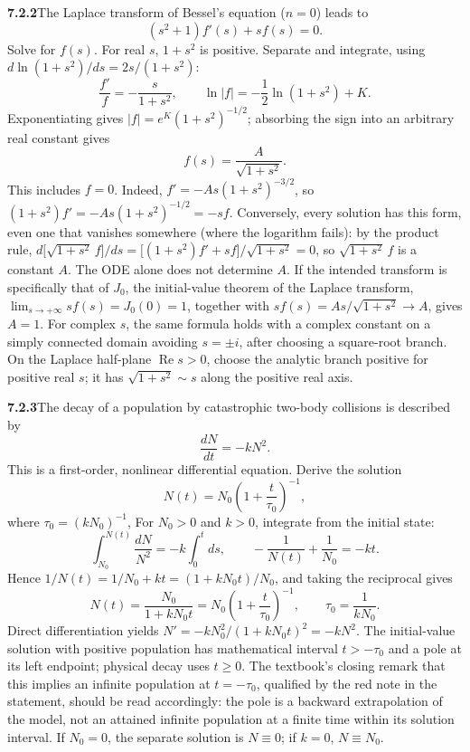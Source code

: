 \par\bigskip
\noindent\textbf{7.2.2}\quad The Laplace transform of Bessel's equation
($n=0$) leads to
\[
(s^{2}+1)f'(s)+sf(s)=0.
\]
Solve for $f(s)$.
\solution
For real $s$, $1+s^2$ is positive. Separate and integrate, using
$d\ln(1+s^2)/ds=2s/(1+s^2)$:
\[
\frac{f'}f=-\frac{s}{1+s^2},\qquad
\ln|f|=-\frac12\ln(1+s^2)+K.
\]
Exponentiating gives $|f|=e^K(1+s^2)^{-1/2}$; absorbing the sign into an
arbitrary real constant gives
\[
\boxed{f(s)=\frac{A}{\sqrt{1+s^2}}}.
\]
This includes $f=0$. Indeed,
$f'=-As(1+s^2)^{-3/2}$, so $(1+s^2)f'=-As(1+s^2)^{-1/2}=-sf$.
Conversely, every solution has this form, even one that vanishes
somewhere (where the logarithm fails): by the product rule,
$d\bigl[\sqrt{1+s^2}\,f\bigr]/ds=\bigl[(1+s^2)f'+sf\bigr]/\sqrt{1+s^2}=0$,
so $\sqrt{1+s^2}\,f$ is a constant $A$.
The ODE alone does not determine $A$. If the intended transform is
specifically that of $J_0$, the initial-value theorem of the Laplace
transform, $\lim_{s\to+\infty}sf(s)=J_0(0)=1$, together with
$sf(s)=As/\sqrt{1+s^2}\to A$, gives $A=1$.
For complex $s$, the same formula holds with a complex constant on a
simply connected domain avoiding $s=\pm i$, after choosing a square-root
branch. On the Laplace half-plane $\operatorname{Re}s>0$, choose the
analytic branch positive for positive real $s$; it has
$\sqrt{1+s^2}\sim s$ along the positive real axis.

\par\bigskip
\noindent\textbf{7.2.3}\quad The decay of a population by catastrophic
two-body collisions is described by
\[
\frac{dN}{dt}=-kN^{2}.
\]
This is a first-order, nonlinear differential equation. Derive the solution
\[
N(t)=N_{0}\left(1+\frac{t}{\tau_{0}}\right)^{-1},
\]
where $\tau_{0}=(kN_{0})^{-1}$, 
\solution
For $N_0>0$ and $k>0$, integrate from the initial state:
\[
\int_{N_0}^{N(t)}\frac{dN}{N^2}=-k\int_0^t ds,
\qquad -\frac1{N(t)}+\frac1{N_0}=-kt.
\]
Hence $1/N(t)=1/N_0+kt=(1+kN_0t)/N_0$, and taking the reciprocal gives
\[
\boxed{N(t)=\frac{N_0}{1+kN_0t}
=N_0\left(1+\frac t{\tau_0}\right)^{-1}},\qquad
\tau_0=\frac1{kN_0}.
\]
Direct differentiation yields $N'=-kN_0^2/(1+kN_0t)^2=-kN^2$.
The initial-value solution with positive population has mathematical
interval $t> -\tau_0$ and a pole at its left endpoint; physical decay
uses $t\ge0$. The textbook's closing remark that this implies an
infinite population at $t=-\tau_0$, qualified by the red note in the
statement, should be read accordingly: the pole is a backward
extrapolation of the model, not an attained infinite population at a
finite time within its solution interval.
If $N_0=0$, the separate solution is $N\equiv0$; if $k=0$, $N\equiv N_0$.

